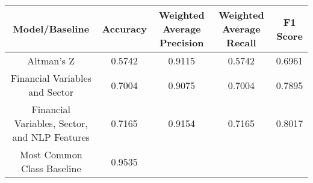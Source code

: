 \footnotesize
\begin{tabular}{ccccc}
\toprule
Model/Baseline & Accuracy & Weighted Average Precision & Weighted Average Recall & F1 Score \\
\midrule
Altman's Z & 0.5742 & 0.9115 & 0.5742 & 0.6961 \\
Financial Variables and Sector & 0.7004 & 0.9075 & 0.7004 & 0.7895 \\
Financial Variables, Sector, and NLP Features & 0.7165 & 0.9154 & 0.7165 & 0.8017 \\
Most Common Class Baseline & 0.9535 &  &  &  \\
\bottomrule
\end{tabular}

\normalsize